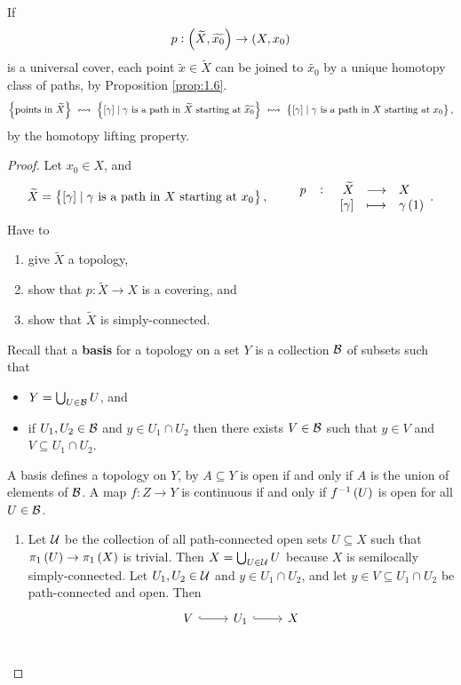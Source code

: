 \begin{remark*}
If
$$ p : \br{\widetilde{X}, \widetilde{x_0}} \to \br{X, x_0} $$
is a universal cover, each point $ \widetilde{x} \in \widetilde{X} $ can be joined to $ \widetilde{x_0} $ by a unique homotopy class of paths, by Proposition \ref{prop:1.6}.
$$ \cbr{\text{points in} \ \widetilde{X}} \ \leftrightsquigarrow \ \cbr{\sbr{\gamma} \mid \gamma \ \text{is a path in} \ \widetilde{X} \ \text{starting at} \ \widetilde{x_0}} \ \leftrightsquigarrow \ \cbr{\sbr{\gamma} \mid \gamma \ \text{is a path in} \ X \ \text{starting at} \ x_0}, $$
by the homotopy lifting property.
\end{remark*}

\begin{proof}
Let $ x_0 \in X $, and
$$ \widetilde{X} = \cbr{\sbr{\gamma} \mid \gamma \ \text{is a path in} \ X \ \text{starting at} \ x_0}, \qquad \function[p]{\widetilde{X}}{X}{\sbr{\gamma}}{\gamma\br{1}}. $$
Have to
\begin{enumerate}
\item give $ \widetilde{X} $ a topology,
\item show that $ p : \widetilde{X} \to X $ is a covering, and
\item show that $ \widetilde{X} $ is simply-connected.
\end{enumerate}
Recall that a \textbf{basis} for a topology on a set $ Y $ is a collection $ \BB $ of subsets such that
\begin{itemize}
\item $ Y = \bigcup_{U \in \BB} U $, and
\item if $ U_1, U_2 \in \BB $ and $ y \in U_1 \cap U_2 $ then there exists $ V \in \BB $ such that $ y \in V $ and $ V \subseteq U_1 \cap U_2 $.
\end{itemize}
A basis defines a topology on $ Y $, by $ A \subseteq Y $ is open if and only if $ A $ is the union of elements of $ \BB $. A map $ f : Z \to Y $ is continuous if and only if $ f^{-1}\br{U} $ is open for all $ U \in \BB $.
\begin{enumerate}
\item Let $ \UU $ be the collection of all path-connected open sets $ U \subseteq X $ such that $ \pi_1\br{U} \to \pi_1\br{X} $ is trivial. Then $ X = \bigcup_{U \in \UU} U $ because $ X $ is semilocally simply-connected. Let $ U_1, U_2 \in \UU $ and $ y \in U_1 \cap U_2 $, and let $ y \in V \subseteq U_1 \cap U_2 $ be path-connected and open. Then
$$
\begin{tikzcd}
V \arrow[hookrightarrow]{r} & U_1 \arrow[hookrightarrow]{r} & X \\

\end{tikzcd}$$
\end{enumerate}
\end{proof}
